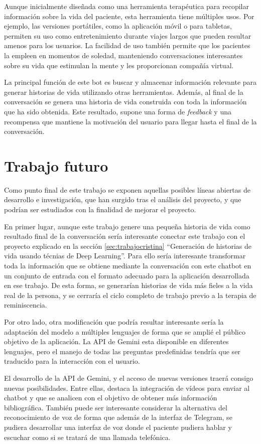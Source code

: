 Aunque inicialmente diseñada como una herramienta terapéutica para recopilar información sobre la vida del paciente, esta herramienta tiene múltiples usos. Por ejemplo, las versiones portátiles, como la aplicación móvil o para tabletas, permiten su uso como entretenimiento durante viajes largos que pueden resultar amenos para los usuarios. La facilidad de uso también permite que los pacientes la empleen en momentos de soledad, manteniendo conversaciones interesantes sobre su vida que estimulan la mente y les proporcionan compañía virtual.

La principal función de este bot es buscar y almacenar información relevante para generar historias de vida utilizando otras herramientas. Además, al final de la conversación se genera una historia de vida construida con toda la información que ha sido obtenida. Este resultado, supone una forma de \textit{feedback} y una recompensa que mantiene la motivación del usuario para llegar hasta el final de la conversación. 

\section{Trabajo futuro}

Como punto final de este trabajo se exponen aquellas posibles líneas abiertas de desarrollo e investigación, que han surgido tras el análisis del proyecto, y que podrían ser estudiados con la finalidad de mejorar el proyecto. 

En primer lugar, aunque este trabajo genere una pequeña historia de vida como resultado final de la conversación sería interesante conectar este trabajo con el proyecto explicado en la sección \ref{sec:trabajocristina} ``Generación de historias de vida usando técnias de Deep Learning''. Para ello sería interesante transformar toda la información que se obtiene mediante la conversación con este chatbot en un conjunto de entrada con el formato adecuado para la aplicación desarrollada en ese trabajo. De esta forma, se generarían historias de vida más fieles a la vida real de la persona, y se cerraría el ciclo completo de trabajo previo a la terapia de reminiscencia. 

Por otro lado, otra modificación que podría resultar interesante sería la adaptación del modelo a múltiples lenguajes de forma que se amplié el público objetivo de la aplicación. La API de Gemini esta disponible en diferentes lenguajes, pero el manejo de todas las preguntas predefinidas tendría que ser traducido para la interacción con el usuario. 

El desarrollo de la API de Gemini, y el acceso de nuevas versiones traerá consigo nuevas posibilidades. Entre ellas, destaca la integración de vídeos para enviar al chatbot y que se analicen con el objetivo de obtener más información bibliográfica. También puede ser interesante considerar la alternativa del reconocimiento de voz de forma que además de la interfaz de Telegram, se pudiera desarrollar una interfaz de voz donde el paciente pudiera hablar y escuchar como si se tratará de una llamada telefónica.
